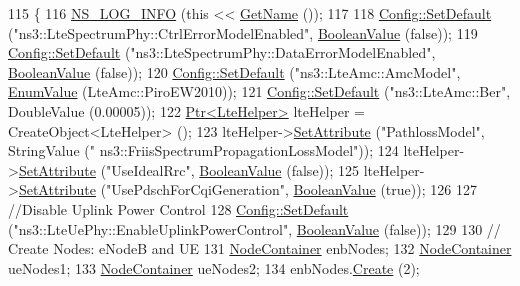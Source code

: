 \begin{DoxyCode}
115 \{
116   \hyperlink{group__logging_gafbd73ee2cf9f26b319f49086d8e860fb}{NS\_LOG\_INFO} (\textcolor{keyword}{this} << \hyperlink{classns3_1_1TestCase_a28f7bb59669c24dae1c290fc17fc9b62}{GetName} ());
117   
118   \hyperlink{group__config_ga2e7882df849d8ba4aaad31c934c40c06}{Config::SetDefault} (\textcolor{stringliteral}{"ns3::LteSpectrumPhy::CtrlErrorModelEnabled"}, 
      \hyperlink{classns3_1_1BooleanValue}{BooleanValue} (\textcolor{keyword}{false}));
119   \hyperlink{group__config_ga2e7882df849d8ba4aaad31c934c40c06}{Config::SetDefault} (\textcolor{stringliteral}{"ns3::LteSpectrumPhy::DataErrorModelEnabled"}, 
      \hyperlink{classns3_1_1BooleanValue}{BooleanValue} (\textcolor{keyword}{false}));
120   \hyperlink{group__config_ga2e7882df849d8ba4aaad31c934c40c06}{Config::SetDefault} (\textcolor{stringliteral}{"ns3::LteAmc::AmcModel"}, \hyperlink{classns3_1_1EnumValue}{EnumValue} (LteAmc::PiroEW2010));
121   \hyperlink{group__config_ga2e7882df849d8ba4aaad31c934c40c06}{Config::SetDefault} (\textcolor{stringliteral}{"ns3::LteAmc::Ber"}, DoubleValue (0.00005));
122   \hyperlink{classns3_1_1Ptr}{Ptr<LteHelper>} lteHelper = CreateObject<LteHelper> ();
123   lteHelper->\hyperlink{classns3_1_1ObjectBase_ac60245d3ea4123bbc9b1d391f1f6592f}{SetAttribute} (\textcolor{stringliteral}{"PathlossModel"}, StringValue (\textcolor{stringliteral}{"
      ns3::FriisSpectrumPropagationLossModel"}));
124   lteHelper->\hyperlink{classns3_1_1ObjectBase_ac60245d3ea4123bbc9b1d391f1f6592f}{SetAttribute} (\textcolor{stringliteral}{"UseIdealRrc"}, \hyperlink{classns3_1_1BooleanValue}{BooleanValue} (\textcolor{keyword}{false}));
125   lteHelper->\hyperlink{classns3_1_1ObjectBase_ac60245d3ea4123bbc9b1d391f1f6592f}{SetAttribute} (\textcolor{stringliteral}{"UsePdschForCqiGeneration"}, \hyperlink{classns3_1_1BooleanValue}{BooleanValue} (\textcolor{keyword}{true}));
126 
127   \textcolor{comment}{//Disable Uplink Power Control}
128   \hyperlink{group__config_ga2e7882df849d8ba4aaad31c934c40c06}{Config::SetDefault} (\textcolor{stringliteral}{"ns3::LteUePhy::EnableUplinkPowerControl"}, 
      \hyperlink{classns3_1_1BooleanValue}{BooleanValue} (\textcolor{keyword}{false}));
129 
130   \textcolor{comment}{// Create Nodes: eNodeB and UE}
131   \hyperlink{classns3_1_1NodeContainer}{NodeContainer} enbNodes;
132   \hyperlink{classns3_1_1NodeContainer}{NodeContainer} ueNodes1;
133   \hyperlink{classns3_1_1NodeContainer}{NodeContainer} ueNodes2;
134   enbNodes.\hyperlink{classns3_1_1NodeContainer_a787f059e2813e8b951cc6914d11dfe69}{Create} (2);

\end{DoxyCode}
